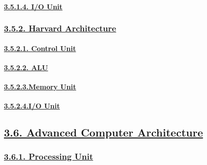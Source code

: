 \documentclass[
]{article}
\begin{document}
\hypertarget{io-unit}{%
\paragraph{\texorpdfstring{\protect\hyperlink{io-unit-2}{3.5.1.4. I/O
Unit}}{3.5.1.4. I/O Unit}}\label{io-unit}}

\hypertarget{harvard-architecture}{%
\subsubsection{\texorpdfstring{\protect\hyperlink{harvard-architecture-1}{3.5.2.
Harvard
Architecture}}{3.5.2. Harvard Architecture}}\label{harvard-architecture}}

\hypertarget{control-unit-1}{%
\paragraph{\texorpdfstring{\protect\hyperlink{control-unit-3}{3.5.2.1.
Control Unit}}{3.5.2.1. Control Unit}}\label{control-unit-1}}

\hypertarget{alu-1}{%
\paragraph{\texorpdfstring{\protect\hyperlink{alu-3}{3.5.2.2.
ALU}}{3.5.2.2. ALU}}\label{alu-1}}

\hypertarget{memory-unit-1}{%
\paragraph{\texorpdfstring{\protect\hyperlink{memory-unit-3}{3.5.2.3.Memory
Unit}}{3.5.2.3.Memory Unit}}\label{memory-unit-1}}

\hypertarget{io-unit-1}{%
\paragraph{\texorpdfstring{\protect\hyperlink{io-unit-3}{3.5.2.4.I/O
Unit}}{3.5.2.4.I/O Unit}}\label{io-unit-1}}

\hypertarget{advanced-computer-architecture}{%
\subsection{\texorpdfstring{\protect\hyperlink{advanced-computer-architecture-1}{3.6.
Advanced Computer
Architecture}}{3.6. Advanced Computer Architecture}}\label{advanced-computer-architecture}}

\hypertarget{processing-unit}{%
\subsubsection{\texorpdfstring{\protect\hyperlink{processing-unit-1}{3.6.1.
Processing Unit}}{3.6.1. Processing Unit}}\label{processing-unit}}
\end{document}
